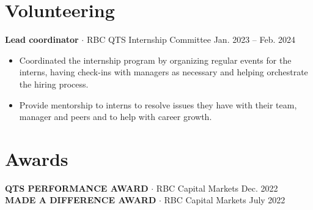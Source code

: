 \documentclass[a4paper,10pt]{article}
\begin{document}
\section*{Volunteering}
\noindent
\textbf{Lead coordinator}  {$\bm{\cdot}$}  RBC QTS  Internship Committee \hfill Jan. 2023 – Feb. 2024
\vspace{-0.5em}
\begin{itemize}[left=0em]
    \item Coordinated the internship program by organizing regular events for the interns, having check-ins with managers as necessary and helping orchestrate the hiring process.
    \item Provide mentorship to interns to resolve issues they have with their team, manager and peers and to help with career growth.
\end{itemize}

\section*{Awards}
\noindent
\textbf{QTS PERFORMANCE AWARD} {$\bm{\cdot}$} RBC Capital Markets \hfill Dec. 2022 \\
\textbf{MADE A DIFFERENCE AWARD} {$\bm{\cdot}$} RBC Capital Markets \hfill July 2022 \\
\end{document}
